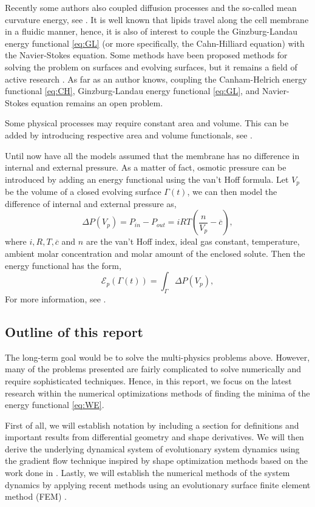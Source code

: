 Recently some authors also coupled diffusion processes and the so-called mean curvature energy, see \cite{burger2021interaction, elliott2022numerical}. It is well known that lipids travel
along the cell membrane in a fluidic manner, hence, it is also of interest to couple the Ginzburg-Landau energy functional \eqref{eq:GL} (or more specifically, the Cahn-Hilliard equation) with the Navier-Stokes equation. Some methods have been proposed
methods for solving the problem on surfaces
and evolving surfaces, but it remains a field of active research \cite{olshanskii2022comparison}. As far as an author knows, coupling the Canham-Helrich energy functional \eqref{eq:CH}, Ginzburg-Landau energy functional \eqref{eq:GL},  and Navier-Stokes equation remains an open problem.

Some physical processes may require constant area and volume. This can be added by introducing respective area and volume functionals, see \cite[Definition 2.5]{muller2013volume}.

Until now have all the models assumed that the membrane has no difference in internal and external pressure. As a matter of fact, osmotic pressure can be introduced by adding an energy functional using the van't Hoff formula. Let $V_{p}$ be the volume
of a closed evolving surface $\Gamma \left( t \right) $, we can then model the difference of internal and external pressure as,
\[
\Delta P \left( V_{p} \right) = P_{in} - P_{out} = iRT\left( \frac{n}{V_{p}} - \overline{c}  \right),
\]
where $i, R, T, \overline{c} $ and $n$ are the van't Hoff index, ideal gas constant, temperature, ambient molar concentration and molar amount of the enclosed solute. Then the energy
functional has the form,
\[
\mathcal{E} _{p}\left( \Gamma\left( t \right)     \right)  = \int_{\Gamma   }^{   } \Delta P\left( V_{p} \right) ,
\]
For more information, see \cite{zhu2022mem3dg}.


\subsection{Outline of this report}%
\label{sub:outline_of_this_report}

The long-term goal would be to solve the multi-physics problems above. However, many of the problems presented are fairly complicated to solve numerically and require sophisticated techniques. Hence, in this report, we focus on the latest research within
the numerical optimizations methods of finding the minima of the energy functional \eqref{eq:WE}.

First of all, we will establish notation by including a section for definitions and important results from differential geometry and shape derivatives. We will then derive the
underlying dynamical system of evolutionary system dynamics using the gradient flow technique inspired by shape optimization methods based on the work done in \cite{ dougan2012first}. Lastly, we will establish the numerical methods of the system
dynamics by applying recent methods using an evolutionary surface finite element method (FEM) \cite{kovacs2021convergent, hu2022evolving}.


